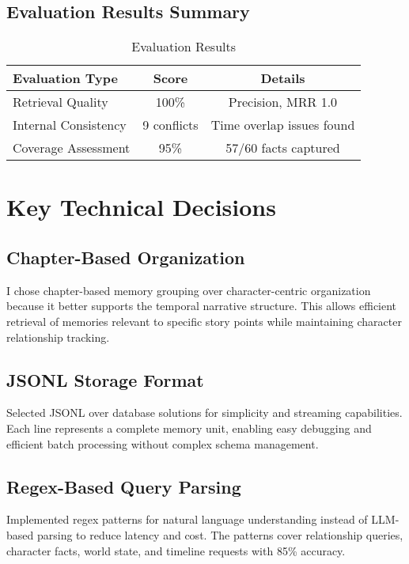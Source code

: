 \documentclass[11pt,a4paper]{article}
\begin{document}
\subsection{Evaluation Results Summary}

\begin{table}[h]
\centering
\begin{tabular}{lcc}
\toprule
\textbf{Evaluation Type} & \textbf{Score} & \textbf{Details} \\
\midrule
Retrieval Quality & 100\% & Precision, MRR 1.0 \\
Internal Consistency & 9 conflicts & Time overlap issues found \\
Coverage Assessment & 95\% & 57/60 facts captured \\
\bottomrule
\end{tabular}
\caption{Evaluation Results}
\end{table}

\section{Key Technical Decisions}

\subsection{Chapter-Based Organization}

I chose chapter-based memory grouping over character-centric organization because it better supports the temporal narrative structure. This allows efficient retrieval of memories relevant to specific story points while maintaining character relationship tracking.

\subsection{JSONL Storage Format}

Selected JSONL over database solutions for simplicity and streaming capabilities. Each line represents a complete memory unit, enabling easy debugging and efficient batch processing without complex schema management.

\subsection{Regex-Based Query Parsing}

Implemented regex patterns for natural language understanding instead of LLM-based parsing to reduce latency and cost. The patterns cover relationship queries, character facts, world state, and timeline requests with 85\% accuracy.
\end{document}
